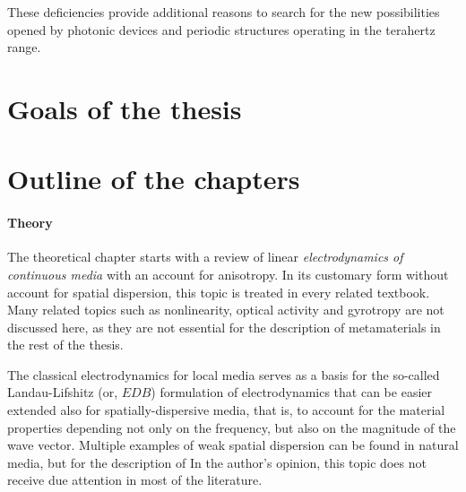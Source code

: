These deficiencies provide additional reasons to search for the new possibilities opened by photonic devices and periodic structures operating in the terahertz range.  

\section{Goals of the thesis}

\section{Outline of the chapters}
\paragraph{Theory} %
The theoretical chapter starts with a review of linear \textit{electrodynamics of continuous media} with an account for anisotropy. In its customary form without account for spatial dispersion, this topic is treated in every related textbook. Many related topics such as nonlinearity, optical activity and gyrotropy are not discussed here, as they are not essential for the description of metamaterials in the rest of the thesis.  

The classical electrodynamics for local media serves as a basis for the so-called Landau-Lifshitz (or, $EDB$) formulation of electrodynamics that can be easier extended also for spatially-dispersive media, that is, to account for the material properties depending not only on the frequency, but also on the magnitude of the wave vector.
Multiple examples of weak spatial dispersion can be found in natural media, but for the description of  
In the author's opinion, this topic does not receive due attention in most of the literature.

